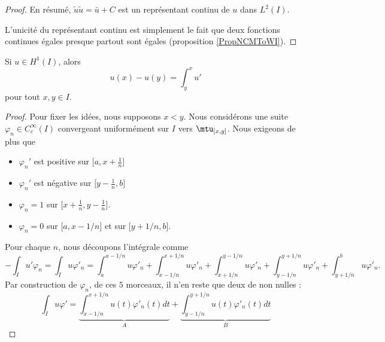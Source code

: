 \begin{proof}
        En résumé, \( \tilde u\tilde u=\bar u+C\) est un représentant continu de \( u\) dans \( L^2(I)\).

        L'unicité du représentant continu est simplement le fait que deux fonctions continues égales presque partout sont égales (proposition  \ref{PropNCMToWI}).
    
\end{proof}

\begin{proposition}     \label{PropGWOIoDg}
    Si \( u\in H^1(I)\), alors
    \begin{equation}
        u(x)-u(y)=\int_y^xu'
    \end{equation}
    pour tout \( x,y\in I\).
\end{proposition}

\begin{proof}
    Pour fixer les idées, nous supposons \( x<y\). Nous considérons une suite \( \varphi_n\in C^{\infty}_c(I)\) convergeant uniformément sur \( I\) vers \( \mtu_{\mathopen[ x , y \mathclose]}\). Nous exigeons de plus que 
    \begin{itemize}
        \item 
        \( \varphi_n'\) est positive sur \( \mathopen[ a , x+\frac{1}{ n } \mathclose]\)
    \item
        \( \varphi_n'\) est négative sur \( \mathopen[ y-\frac{1}{ n } , b \mathclose]\) 
    \item
        \( \varphi_n=1\) sur \( \mathopen[ x+\frac{1}{ n } , y-\frac{1}{ n } \mathclose]\).
    \item
        \( \varphi_n=0\) sur \( \mathopen[ a , x-1/n \mathclose]\) et sur \( \mathopen[ y+1/n , b \mathclose]\).
    \end{itemize}
    Pour chaque \( n\), nous découpons l'intégrale comme
    \begin{equation}        \label{EqRPwqpve}
        -\int_Iu'\varphi_n=\int_Iu\varphi'_n=\int_a^{a-1/n}u\varphi'_n+\int_{x-1/n}^{x+1/n}u\varphi'_n+\int_{x+1/n}^{y-1/n}u\varphi'_n+\int_{y-1/n}^{y+1/n}u\varphi'_n+\int_{y+1/n}^{b}u\varphi'_n.
    \end{equation}
    Par construction de \( \varphi_n\), de ces \( 5\) morceaux, il n'en reste que deux de non nulles :
    \begin{equation}
        \int_Iu\varphi'=\underbrace{\int_{x-1/n}^{x+1/n}u(t)\varphi'_n(t)dt}_A+\underbrace{\int_{y-1/n}^{y+1/n}u(t)\varphi'_n(t)dt}_B
    \end{equation}


\end{proof}
